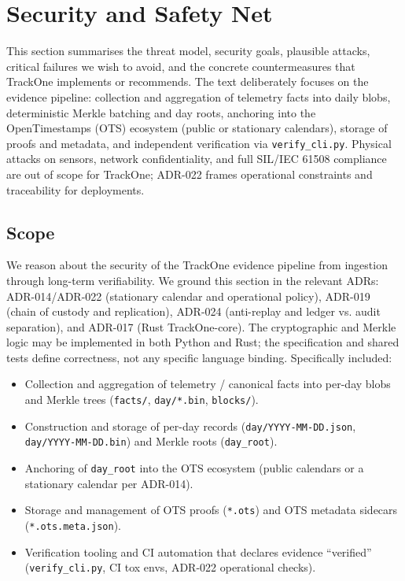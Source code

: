 \section{Security and Safety Net}
\label{sec:security}

This section summarises the threat model, security goals, plausible attacks, critical failures we wish to avoid, and the concrete countermeasures that TrackOne implements or recommends.
The text deliberately focuses on the evidence pipeline: collection and aggregation of telemetry facts into daily blobs, deterministic Merkle batching and day roots, anchoring into the OpenTimestamps (\ac{OTS}) ecosystem (public or stationary calendars), storage of proofs and metadata, and independent verification via \texttt{verify\_cli.py}.
Physical attacks on sensors, network confidentiality, and full \ac{SIL}/IEC 61508 compliance are out of scope for TrackOne; \ac{ADR}-022 frames operational constraints and traceability for deployments.

\subsection{Scope}
We reason about the security of the TrackOne evidence pipeline from ingestion through long-term verifiability.
We ground this section in the relevant \ac{ADR}s: \ac{ADR}-014/\ac{ADR}-022 (stationary calendar and operational policy), \ac{ADR}-019 (chain of custody and replication), \ac{ADR}-024 (anti-replay and ledger vs.
audit separation), and \ac{ADR}-017 (Rust TrackOne-core).
The cryptographic and Merkle logic may be implemented in both Python and Rust; the specification and shared tests define correctness, not any specific language binding.
Specifically included:
\begin{itemize}[nosep]
  \item Collection and aggregation of telemetry / canonical facts into per-day blobs and Merkle trees (\texttt{facts/}, \texttt{day/*.bin}, \texttt{blocks/}).
  \item Construction and storage of per-day records (\texttt{day/YYYY-MM-DD.json}, \texttt{day/YYYY-MM-DD.bin}) and Merkle roots (\texttt{day\_root}).
  \item Anchoring of \texttt{day\_root} into the \ac{OTS} ecosystem (public calendars or a stationary calendar per \ac{ADR}-014).
  \item Storage and management of \ac{OTS} proofs (\texttt{*.ots}) and \ac{OTS} metadata sidecars (\texttt{*.ots.meta.json}).
  \item Verification tooling and \ac{CI} automation that declares evidence ``verified'' (\texttt{verify\_cli.py}, \ac{CI} tox envs, \ac{ADR}-022 operational checks).
\end{itemize}

